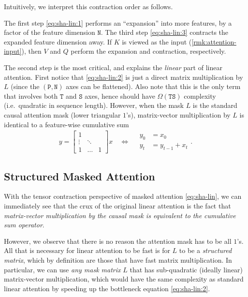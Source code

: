 Intuitively, we interpret this contraction order as follows.

The first step \eqref{eq:sha-lin:1} performs an ``expansion'' into more features, by a factor of the feature dimension $\mathtt{N}$.
The third step \eqref{eq:sha-lin:3} contracts the expanded feature dimension away.
If $K$ is viewed as the input (\cref{rmk:attention-input}),
then $V$ and $Q$ perform the expansion and contraction, respectively.

The second step is the most critical, and explains the \emph{linear} part of linear attention.
First notice that \eqref{eq:sha-lin:2} is just a direct matrix multiplication by $L$ (since the $\mathtt{(P,N)}$ axes can be flattened).
Also note that this is the only term that involves both $\mathtt{T}$ and $\mathtt{S}$ axes,
hence should have $\Omega(\mathtt{TS})$ complexity (i.e.\ quadratic in sequence length).
However, when the mask $L$ is the standard causal attention mask (lower triangular $1$'s),
matrix-vector multiplication by $L$ is identical to a feature-wise cumulative sum
\begin{align*}%
  y = \begin{bmatrix} 1 \\ \vdots & \ddots \\ 1 & \dots & 1 \end{bmatrix} x
  \quad\iff\quad
  \begin{aligned}
    y_0 &= x_0 \\
    y_t &= y_{t-1} + x_t
  \end{aligned}
  .
\end{align*}


%

\subsection{Structured Masked Attention}
\label{sec:structured-attention}

With the tensor contraction perspective of masked attention \eqref{eq:sha-lin},
we can immediately see that the crux of the original linear attention is the fact that \emph{matrix-vector multiplication by the causal mask is equivalent to the cumulative sum operator}.

However, we observe that there is no reason the attention mask has to be all $1$'s.
All that is necessary for linear attention to be fast is for $L$ to be a \emph{structured matrix},
which by definition are those that have fast matrix multiplication\iftoggle{arxiv}{ (\cref{sec:overview:structured-matrix})}{}.
In particular, we can use \emph{any mask matrix} $L$ that has sub-quadratic (ideally linear) matrix-vector multiplication,
which would have the same complexity as standard linear attention by speeding up the bottleneck equation \eqref{eq:sha-lin:2}.

